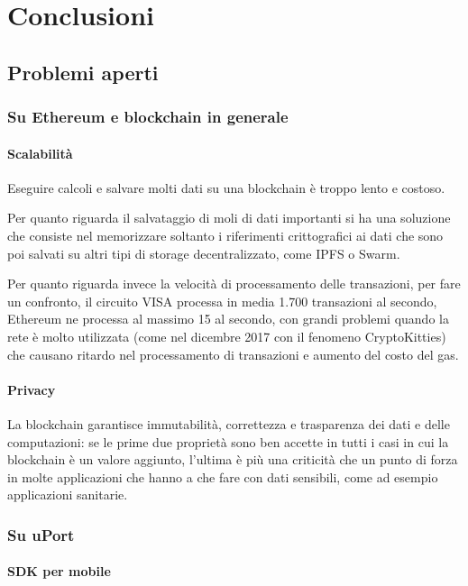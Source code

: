 \chapter{Conclusioni}

\section{Problemi aperti}

\subsection{Su Ethereum e blockchain in generale}

\subsubsection{Scalabilità}
Eseguire calcoli e salvare molti dati su una blockchain è troppo lento e costoso. 

Per quanto riguarda il salvataggio di moli di dati
importanti si ha una soluzione che consiste nel memorizzare soltanto i riferimenti crittografici
ai dati che sono poi salvati su altri tipi
di storage decentralizzato, come IPFS o Swarm.

Per quanto riguarda invece la velocità di processamento delle transazioni, per fare un confronto,
il circuito VISA processa in media 1.700 transazioni al secondo,
Ethereum ne processa al massimo 15 al secondo, con grandi problemi quando
la rete è molto utilizzata (come nel dicembre 2017 con il fenomeno CryptoKitties)
che causano ritardo nel processamento di transazioni e aumento del costo del gas.

\subsubsection{Privacy}

La blockchain garantisce immutabilità, correttezza e trasparenza dei dati e delle computazioni:
se le prime due proprietà sono ben accette in tutti i casi in cui la blockchain è un valore aggiunto,
l'ultima è più una criticità che un punto di forza in molte applicazioni
che hanno a che fare con dati sensibili, come ad esempio applicazioni sanitarie.

\subsection{Su uPort}

\subsubsection{SDK per mobile}


